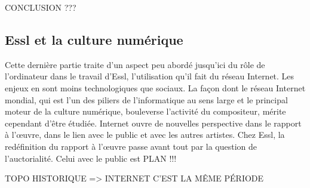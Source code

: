 \documentclass[a4paper,12pt]{article}
\begin{document}
CONCLUSION ???

\subsection{Essl et la culture numérique}

Cette dernière partie traite d'un aspect peu abordé jusqu'ici du rôle de l'ordinateur dans le travail d'Essl, l'utilisation qu'il fait du réseau Internet. Les enjeux en sont moins technologiques que sociaux. La façon dont le réseau Internet mondial, qui est l'un des piliers de l'informatique au sens large et le principal moteur de la culture numérique, bouleverse l'activité du compositeur, mérite cependant d'être étudiée. Internet ouvre de nouvelles perspective dans le rapport à l'œuvre, dans le lien avec le public et avec les autres artistes. Chez Essl, la redéfinition du rapport à l'œuvre passe avant tout par la question de l'auctorialité. Celui avec le public est 
PLAN !!!

TOPO HISTORIQUE => INTERNET C'EST LA MÊME PÉRIODE
\end{document}
